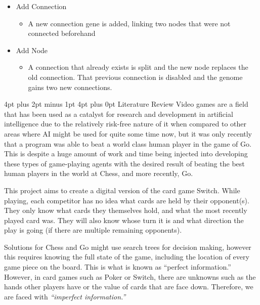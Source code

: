 \documentclass[12pt,a4paper]{article}
\makeatletter
\renewcommand\section{\@startsection {section}{1}{0mm} %
                               {4pt plus 2pt minus 1pt} %
                               {4pt plus 0pt} %
                               {\bfseries}}
\makeatother
\begin{document}
 \begin{itemize}
 	\item Add Connection
 	\begin{itemize}
 		\item A new connection gene is added, linking two nodes that were not connected beforehand
 	\end{itemize}
 	\item Add Node
 	\begin{itemize}
 		\item A connection that already exists is split and the new node replaces the old connection. That previous connection is disabled and the genome gains two new connections. 
 	\end{itemize}
 \end{itemize}
 
 

\newpage
\section{Literature Review}
Video games are a field that has been used as a catalyst for research and development in artificial intelligence due to the relatively risk-free nature of it when compared to other areas where AI might be used for quite some time now, but it was only recently that a program was able to beat a world class human player in the game of Go\citep{ABriefHistoryOfGameAI}. This is despite a huge amount of work and time being injected into developing these types of game-playing agents with the desired result of beating the best human players in the world at Chess, and more recently, Go. 

This project aims to create a digital version of the card game Switch. While playing, each competitor has no idea what cards are held by their opponent(s). They only know what cards they themselves hold, and what the most recently played card was. They will also know whose turn it is and what direction the play is going (if there are multiple remaining opponents). 

Solutions for Chess and Go might use search trees for decision making, however this requires knowing the full state of the game, including the location of every game piece on the board. This is what is known as \enquote{perfect information.} However, in card games such as Poker or Switch, there are unknowns such as the hands other players have or the value of cards that are face down. Therefore, we are faced with \textit{\enquote{imperfect information.}}\\
\end{document}
